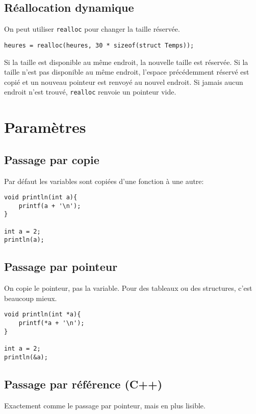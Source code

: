 \documentclass[10pt,a4paper,french]{article}
\begin{document}
\subsection{Réallocation dynamique}

On peut utiliser {\tt realloc} pour changer la taille réservée.

\begin{verbatim}
heures = realloc(heures, 30 * sizeof(struct Temps));
\end{verbatim}

Si la taille est disponible au même endroit, la nouvelle taille est réservée. Si la taille n'est pas disponible au même endroit, l'espace précédemment réservé est copié et un nouveau pointeur est renvoyé au nouvel endroit. Si jamais aucun endroit n'est trouvé, {\tt realloc} renvoie un pointeur vide.

\section{Paramètres}

\subsection{Passage par copie}

Par défaut les variables sont copiées d'une fonction à une autre:

\begin{verbatim}
void println(int a){
    printf(a + '\n');
}

int a = 2;
println(a);
\end{verbatim}

\subsection{Passage par pointeur}

On copie le pointeur, pas la variable. Pour des tableaux ou des structures, c'est beaucoup mieux.

\begin{verbatim}
void println(int *a){
    printf(*a + '\n');
}

int a = 2;
println(&a);
\end{verbatim}

\subsection{Passage par référence (C++)}

Exactement comme le passage par pointeur, mais en plus lisible.
\end{document}
